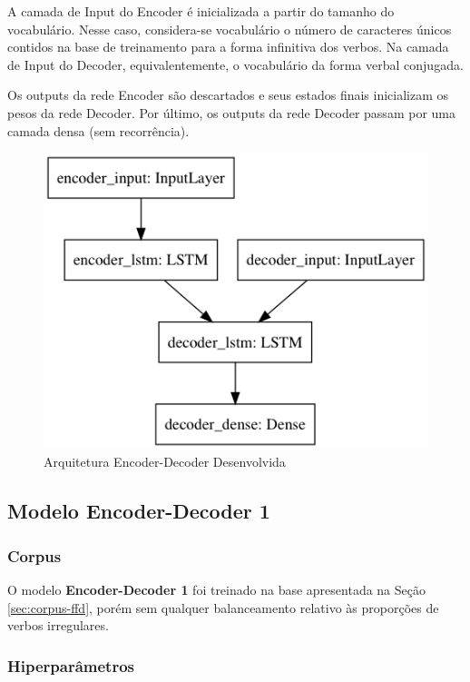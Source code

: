 A camada de Input do Encoder é inicializada a partir do tamanho do vocabulário. Nesse caso, considera-se vocabulário o número de caracteres únicos contidos na base de treinamento para a forma infinitiva dos verbos. Na camada de Input do Decoder, equivalentemente, o vocabulário da forma verbal conjugada.

Os outputs da rede Encoder são descartados e seus estados finais inicializam os pesos da rede Decoder. Por último, os outputs da rede Decoder passam por uma camada densa (sem recorrência).


\begin{figure}[H]
  \centering
  \includegraphics[width=0.5\linewidth]{img/draw-model6.png}
  \caption{Arquitetura Encoder-Decoder Desenvolvida}
  \label{fig:encdec}
\end{figure}


\subsection{Modelo Encoder-Decoder 1} 

\subsubsection{Corpus}
O modelo \textbf{Encoder-Decoder 1} foi treinado na base apresentada na Seção \ref{sec:corpus-ffd}, porém sem qualquer balanceamento relativo às proporções de verbos irregulares.

\subsubsection{Hiperparâmetros} 

